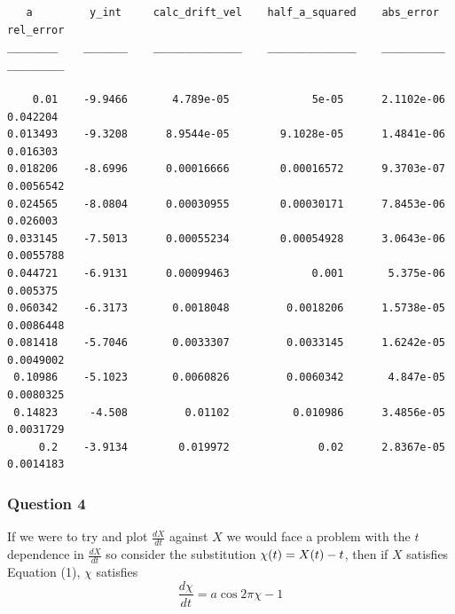 \documentclass[11pt]{article} %
\let\originalleft\left
\let\originalright\right
\renewcommand{\left}{\mathopen{}\mathclose\bgroup\originalleft}
\renewcommand{\right}{\aftergroup\egroup\originalright}
\begin{document}
\begin{verbatim}
   a         y_int     calc_drift_vel    half_a_squared    abs_error     rel_error
________    _______    ______________    ______________    __________    _________

    0.01    -9.9466       4.789e-05             5e-05      2.1102e-06     0.042204
0.013493    -9.3208      8.9544e-05        9.1028e-05      1.4841e-06     0.016303
0.018206    -8.6996      0.00016666        0.00016572      9.3703e-07    0.0056542
0.024565    -8.0804      0.00030955        0.00030171      7.8453e-06     0.026003
0.033145    -7.5013      0.00055234        0.00054928      3.0643e-06    0.0055788
0.044721    -6.9131      0.00099463             0.001       5.375e-06     0.005375
0.060342    -6.3173       0.0018048         0.0018206      1.5738e-05    0.0086448
0.081418    -5.7046       0.0033307         0.0033145      1.6242e-05    0.0049002
 0.10986    -5.1023       0.0060826         0.0060342       4.847e-05    0.0080325
 0.14823     -4.508         0.01102          0.010986      3.4856e-05    0.0031729
     0.2    -3.9134        0.019972              0.02      2.8367e-05    0.0014183
\end{verbatim}

\subsubsection*{Question 4}

If we were to try and plot $\frac{dX}{dt}$ against $X$ we would face a problem with the $t$ dependence in $\frac{dX}{dt}$ so consider the substitution $\chi\left( t \right) = X \left( t \right) - t$, then if $X$ satisfies Equation (1), $\chi$ satisfies
\begin{equation}
	\frac{d\chi}{dt} = a \cos 2\pi\chi - 1
\end{equation}
\end{document}
